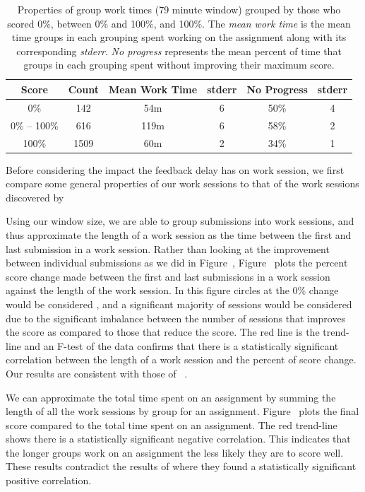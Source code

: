 \begin{table}
\centering
\begin{tabular}{|c||c|c|c|c|c|} \hline
Score & Count & Mean Work Time & stderr & No Progress & stderr \\ \hline \hline
0\% & 142 & 54m & 6 & 50\% & 4 \\ \hline
0\% -- 100\% & 616 & 119m & 6 & 58\% & 2 \\ \hline
100\% & 1509 & 60m & 2 & 34\% & 1 \\ \hline
\end{tabular}
\caption{Properties of group work times (79 minute window) grouped by those who
  scored 0\%, between 0\% and 100\%, and 100\%. The \emph{mean work time} is
  the mean time groups in each grouping spent working on the assignment along
  with its corresponding \emph{stderr}. \emph{No progress} represents the mean
  percent of time that groups in each grouping spent without improving their
  maximum score.}
\end{table}

Before considering the impact the feedback delay has on work session, we first
compare some general properties of our work sessions to that of the work
sessions discovered by \spacco{}

Using our window size, we are able to group submissions into work sessions, and
thus approximate the length of a work session as the time between the first and
last submission in a work session. Rather than looking at the improvement
between individual submissions as we did in
Figure~, Figure~
plots the percent score change made between the first and last submissions in a
work session against the length of the work session. In this figure circles at
the 0\% change would be considered \noi{}, and a significant majority of
sessions would be considered \imp{} due to the significant imbalance between
the number of sessions that improves the score as compared to those that reduce
the score. The red line is the trend-line and an F-test of the data confirms
that there is a statistically significant correlation between the length of a
work session and the percent of score change. Our results are consistent with
those of \spacco{}~\cite{Spacco:2013:TIP:2462476.2465594}.

We can approximate the total time spent on an assignment by summing the length
of all the work sessions by group for an
assignment. Figure~ plots the final score compared to
the total time spent on an assignment. The red trend-line shows there is a
statistically significant negative correlation. This indicates that the longer
groups work on an assignment the less likely they are to score well. These
results contradict the results of \spacco{} where they found a statistically
significant positive correlation.

